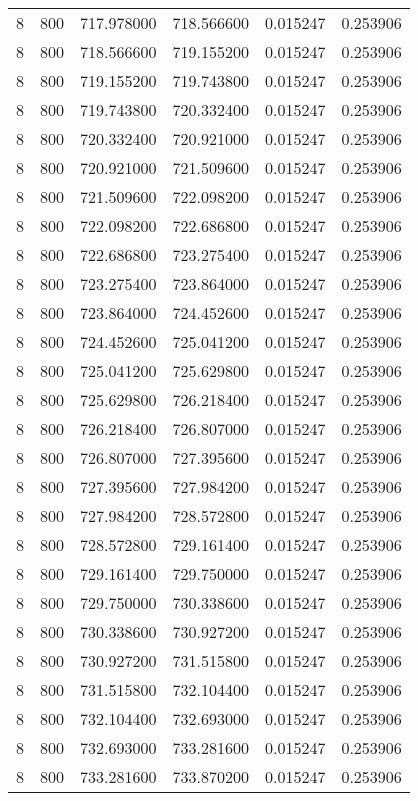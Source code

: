 \begin{longtable}{rrrrrr}
8 & 800 & 717.978000 & 718.566600 & 0.015247 & 0.253906 \\
8 & 800 & 718.566600 & 719.155200 & 0.015247 & 0.253906 \\
8 & 800 & 719.155200 & 719.743800 & 0.015247 & 0.253906 \\
8 & 800 & 719.743800 & 720.332400 & 0.015247 & 0.253906 \\
8 & 800 & 720.332400 & 720.921000 & 0.015247 & 0.253906 \\
8 & 800 & 720.921000 & 721.509600 & 0.015247 & 0.253906 \\
8 & 800 & 721.509600 & 722.098200 & 0.015247 & 0.253906 \\
8 & 800 & 722.098200 & 722.686800 & 0.015247 & 0.253906 \\
8 & 800 & 722.686800 & 723.275400 & 0.015247 & 0.253906 \\
8 & 800 & 723.275400 & 723.864000 & 0.015247 & 0.253906 \\
8 & 800 & 723.864000 & 724.452600 & 0.015247 & 0.253906 \\
8 & 800 & 724.452600 & 725.041200 & 0.015247 & 0.253906 \\
8 & 800 & 725.041200 & 725.629800 & 0.015247 & 0.253906 \\
8 & 800 & 725.629800 & 726.218400 & 0.015247 & 0.253906 \\
8 & 800 & 726.218400 & 726.807000 & 0.015247 & 0.253906 \\
8 & 800 & 726.807000 & 727.395600 & 0.015247 & 0.253906 \\
8 & 800 & 727.395600 & 727.984200 & 0.015247 & 0.253906 \\
8 & 800 & 727.984200 & 728.572800 & 0.015247 & 0.253906 \\
8 & 800 & 728.572800 & 729.161400 & 0.015247 & 0.253906 \\
8 & 800 & 729.161400 & 729.750000 & 0.015247 & 0.253906 \\
8 & 800 & 729.750000 & 730.338600 & 0.015247 & 0.253906 \\
8 & 800 & 730.338600 & 730.927200 & 0.015247 & 0.253906 \\
8 & 800 & 730.927200 & 731.515800 & 0.015247 & 0.253906 \\
8 & 800 & 731.515800 & 732.104400 & 0.015247 & 0.253906 \\
8 & 800 & 732.104400 & 732.693000 & 0.015247 & 0.253906 \\
8 & 800 & 732.693000 & 733.281600 & 0.015247 & 0.253906 \\
8 & 800 & 733.281600 & 733.870200 & 0.015247 & 0.253906 \\

\end{longtable}
